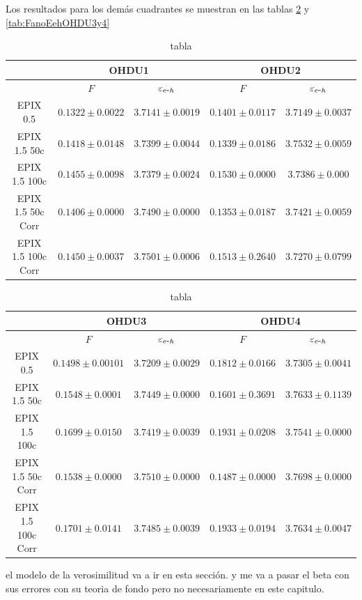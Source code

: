 Los resultados para los demás cuadrantes se muestran en las tablas \ref{tab:FanoEehOHDU1y2} y \ref{tab:FanoEehOHDU3y4}
\begin{table}[H]
\centering
\begin{tabular}{@{}ccccc@{}}
\toprule
                & \multicolumn{2}{c}{OHDU1}                 & \multicolumn{2}{c}{OHDU2}                 \\ \hline\hline
                & $F$                 & $\varepsilon_{e\mbox{-}h}$ & $F$                 & $\varepsilon_{e\mbox{-}h}$ \\
EPIX 0.5 & $0.1322 \pm 0.0022$ & $3.7141 \pm 0.0019$ & $0.1401 \pm 0.0117$ & $3.7149 \pm 0.0037$ \\ \hline
EPIX 1.5 50c & $0.1418 \pm 0.0148$ & $3.7399 \pm 0.0044$ & $0.1339 \pm 0.0186$ & $3.7532 \pm 0.0059$ \\
EPIX 1.5 100c & $0.1455 \pm 0.0098$ & $3.7379 \pm 0.0024$ & $0.1530 \pm 0.0000$ & $3.7386 \pm 0.000$ \\ \hline
EPIX 1.5 50c Corr & $0.1406 \pm 0.0000$ & $3.7490 \pm 0.0000$ & $0.1353 \pm 0.0187$ & $3.7421 \pm 0.0059$ \\
EPIX 1.5 100c Corr & $0.1450 \pm 0.0037$ & $3.7501 \pm 0.0006$ & $0.1513 \pm 0.2640$ & $3.7270 \pm 0.0799$ \\ \bottomrule \hline
\end{tabular}
\caption{tabla}
\label{tab:FanoEehOHDU1y2}
\end{table}
\begin{table}[H]
\centering
\begin{tabular}{@{}ccccc@{}}
\toprule
                & \multicolumn{2}{c}{OHDU3}                 & \multicolumn{2}{c}{OHDU4}                 \\ \hline\hline
                & $F$                 & $\varepsilon_{e\mbox{-}h}$ & $F$                 & $\varepsilon_{e\mbox{-}h}$ \\
EPIX 0.5 & $0.1498 \pm 0.00101$ & $3.7209 \pm 0.0029$ & $0.1812 \pm 0.0166$ & $3.7305 \pm 0.0041$ \\ \hline
EPIX 1.5 50c & $0.1548 \pm 0.0001$ & $3.7449 \pm 0.0000$ & $0.1601 \pm 0.3691$ & $3.7633 \pm 0.1139$ \\
EPIX 1.5 100c & $0.1699 \pm 0.0150$ & $3.7419 \pm 0.0039$ & $0.1931 \pm 0.0208$ & $3.7541 \pm 0.0000$ \\ \hline
EPIX 1.5 50c  Corr& $0.1538 \pm 0.0000$ & $3.7510 \pm 0.0000$ & $0.1487 \pm 0.0000$ & $3.7698 \pm 0.0000$ \\
EPIX 1.5 100c Corr& $0.1701 \pm 0.0141$ & $3.7485 \pm 0.0039$ & $0.1933 \pm 0.0194$ & $3.7634 \pm 0.0047$ \\ \bottomrule \hline
\end{tabular}
\caption{tabla}
\label{tab:FanoEehOHDU1y2}
\end{table}

el modelo de la verosimilitud va a ir en esta sección. y me va a pasar el beta con sus errores con su teoria de fondo pero no necesariamente en este capitulo.

